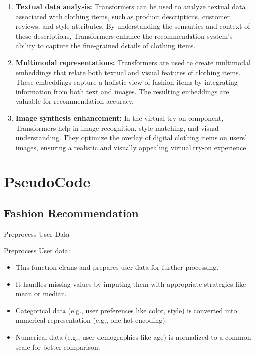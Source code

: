 	\begin{enumerate}
		\item \textbf{Textual data analysis:} Transformers can be used to analyze textual data associated with clothing items, such as product descriptions, customer reviews, and style attributes. By understanding the semantics and context of these descriptions, Transformers enhance the recommendation system's ability to capture the fine-grained details of clothing items.
		\item \textbf{Multimodal representations:} Transformers are used to create multimodal embeddings that relate both textual and visual features of clothing items. These embeddings capture a holistic view of fashion items by integrating information from both text and images. The resulting embeddings are valuable for recommendation accuracy.
		\item \textbf{Image synthesis enhancement:} In the virtual try-on component, Transformers help in image recognition, style matching, and visual understanding. They optimize the overlay of digital clothing items on users' images, ensuring a realistic and visually appealing virtual try-on experience.
	\end{enumerate}

\section{PseudoCode}
\subsection{Fashion Recommendation}
\BlankLine
\begin{algorithm}[H]
  \SetAlgoLined


  \caption{Preprocess User Data}
  \label{alg:preprocess_user_data}
  \BlankLine

\end{algorithm}
 \BlankLine
Preprocess User data:
 \BlankLine
\begin{itemize}
\item This function cleans and prepares user data for further processing.
\item It handles missing values by imputing them with appropriate strategies like mean or median.
\item Categorical data (e.g., user preferences like color, style) is converted into numerical representation (e.g., one-hot encoding).
\item Numerical data (e.g., user demographics like age) is normalized to a common scale for better comparison.
\end{itemize}
 \BlankLine

